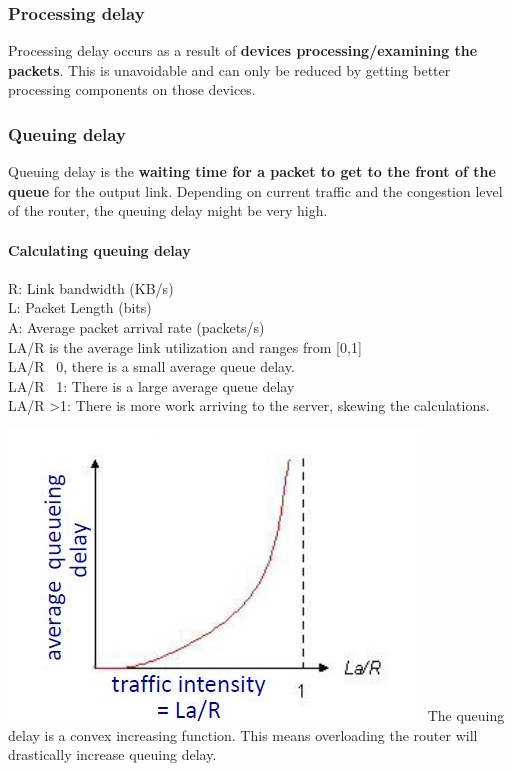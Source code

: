 \documentclass{article}
\begin{document}
\subsubsection{Processing delay}
Processing delay occurs as a result of \textbf{devices processing/examining the packets}. This is unavoidable and can only be reduced by getting better processing components on those devices.

\subsubsection{Queuing delay}
Queuing delay is the \textbf{waiting time for a packet to get to the front of the queue} for the output link. Depending on current traffic and the congestion level of the router, the queuing delay might be very high.

\paragraph{Calculating queuing delay}
R: Link bandwidth (KB/s)\\
L: Packet Length (bits)\\
A: Average packet arrival rate (packets/s)\\
LA/R is the average link utilization and ranges from [0,1]\\
LA/R ~0, there is a small average queue delay.\\
LA/R ~1: There is a large average queue delay \\
LA/R >1: There is more work arriving to the server, skewing the calculations.

\begin{center}
\includegraphics[width=\textwidth]{QueueDelayGraph.JPG}
The queuing delay is a convex increasing function. This means overloading the router will drastically increase queuing delay.
\end{center}
\end{document}
